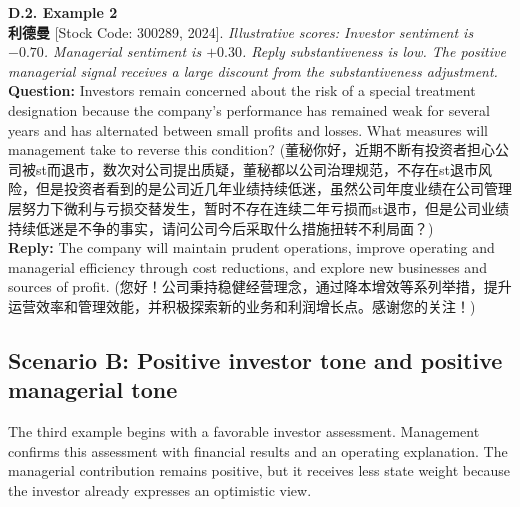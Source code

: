 \noindent \textbf{D.2. Example 2} \\
\textbf{利德曼} [Stock Code: 300289, 2024]. \textit{Illustrative scores: Investor sentiment is $-0.70$. Managerial sentiment is $+0.30$. Reply substantiveness is low. The positive managerial signal receives a large discount from the substantiveness adjustment.} \\
\textbf{Question:} Investors remain concerned about the risk of a special treatment designation because the company's performance has remained weak for several years and has alternated between small profits and losses. What measures will management take to reverse this condition? (董秘你好，近期不断有投资者担心公司被st而退市，数次对公司提出质疑，董秘都以公司治理规范，不存在st退市风险，但是投资者看到的是公司近几年业绩持续低迷，虽然公司年度业绩在公司管理层努力下微利与亏损交替发生，暂时不存在连续二年亏损而st退市，但是公司业绩持续低迷是不争的事实，请问公司今后采取什么措施扭转不利局面？) \\
\textbf{Reply:} The company will maintain prudent operations, improve operating and managerial efficiency through cost reductions, and explore new businesses and sources of profit. (您好！公司秉持稳健经营理念，通过降本增效等系列举措，提升运营效率和管理效能，并积极探索新的业务和利润增长点。感谢您的关注！)

\subsection{Scenario B: Positive investor tone and positive managerial tone}

The third example begins with a favorable investor assessment. Management confirms this assessment with financial results and an operating explanation. The managerial contribution remains positive, but it receives less state weight because the investor already expresses an optimistic view.

